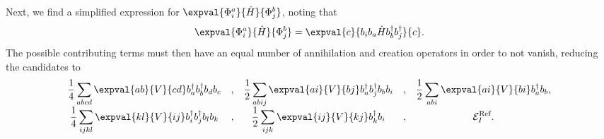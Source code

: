 Next, we find a simplified expression for $\expval{\Phi_i^a}{\hat{H}}{\Phi_j^b}$,
noting that
\begin{equation*}
    \expval{\Phi_i^a}{\hat{H}}{\Phi_j^b} = \expval{c}{b_i b_a \hat{H} b_b^\dagger b_j^\dagger}{c}.
\end{equation*}
The possible contributing terms must then have an equal number of annihilation and creation operators in order to not vanish, reducing the candidates to
\begin{equation*} %
    \begin{array}{cccccc}
        \displaystyle\frac{1}{4} \sum_{abcd} \expval{ab}{V}{cd} b_a^\dagger b_b^\dagger b_d b_c &, &
        \displaystyle\frac{1}{2} \sum_{abij} \expval{ai}{V}{bj} b_a^\dagger b_j^\dagger b_b b_i &, &
        \displaystyle\frac{1}{2} \sum_{abi} \expval{ai}{V}{bi} b_a^\dagger b_b, \\
        \displaystyle\frac{1}{4} \sum_{ijkl} \expval{kl}{V}{ij} b_i^\dagger b_j^\dagger b_l b_k &, &
        \displaystyle\frac{1}{2} \sum_{ijk} \expval{ij}{V}{kj} b_k^\dagger b_i &, &
        \displaystyle\mathcal{E}_I^\text{Ref}.
    \end{array}
\end{equation*}

